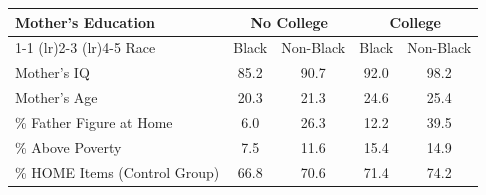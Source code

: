 \begin{tabular}{lcccc}
\toprule 
\midrule 
Mother's Education & \multicolumn{2}{c}{No College} & \multicolumn{2}{c}{College} \\
 \cmidrule(lr){1-1} \cmidrule(lr){2-3} \cmidrule(lr){4-5} 
Race & Black & Non-Black & Black & Non-Black \\
\midrule 
Mother's IQ & 85.2 & 90.7 & 92.0 & 98.2 \\
Mother's Age & 20.3 & 21.3 & 24.6 & 25.4 \\
\% Father Figure at Home & 6.0 & 26.3 & 12.2 & 39.5 \\
\% Above Poverty & 7.5 & 11.6 & 15.4 & 14.9 \\
\% HOME Items (Control Group) & 66.8 & 70.6 & 71.4 & 74.2 \\
\midrule 
\bottomrule 
\end{tabular}
